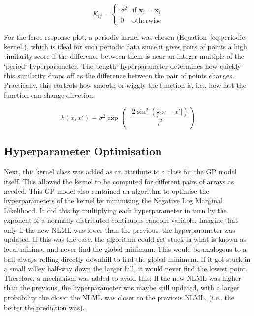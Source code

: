 \documentclass[12pt]{article}
\begin{document}
    \begin{equation}
        K_{ij} =
        \begin{cases}
            \sigma^2 & \text{if } \mathbf{x}_i = \mathbf{x}_j \\
            0 & \text{otherwise}
        \end{cases}\label{eq:white-noise-kernel}
    \end{equation}

    For the force response plot, a periodic kernel was chosen (Equation~\ref{eq:periodic-kernel}), which is ideal for such periodic data since it gives pairs of points a high similarity score if the difference between them is near an integer multiple of the `period` hyperparameter.
    The `length` hyperparameter determines how quickly this similarity drops off as the difference between the pair of points changes.
    Practically, this controls how smooth or wiggly the function is, i.e., how fast the function can change direction.

    \begin{equation}
        k(x, x') = \sigma^2 \exp\left(- \frac{2 \sin^2\left(\frac{\pi}{p} |x - x'|\right)}{l^2}\right)\label{eq:periodic-kernel}
    \end{equation}

    \subsection{Hyperparameter Optimisation}
    Next, this kernel class was added as an attribute to a class for the GP model itself.
    This allowed the kernel to be computed for different pairs of arrays as needed.
    This GP model also contained an algorithm to optimise the hyperparameters of the kernel by minimising the Negative Log Marginal Likelihood.
    It did this by multiplying each hyperparameter in turn by the exponent of a normally distributed continuous random variable.
    Imagine that only if the new NLML was lower than the previous, the hyperparameter was updated.
    If this was the case, the algorithm could get stuck in what is known as local minima, and never find the global minimum.
    This would be analogous to a ball always rolling directly downhill to find the global minimum.
    If it got stuck in a small valley half-way down the larger hill, it would never find the lowest point.
    Therefore, a mechanism was added to avoid this:
    If the new NLML was higher than the previous, the hyperparameter was maybe still updated, with a larger probability the closer the NLML was closer to the previous NLML, (i.e., the better the prediction was).
\end{document}
